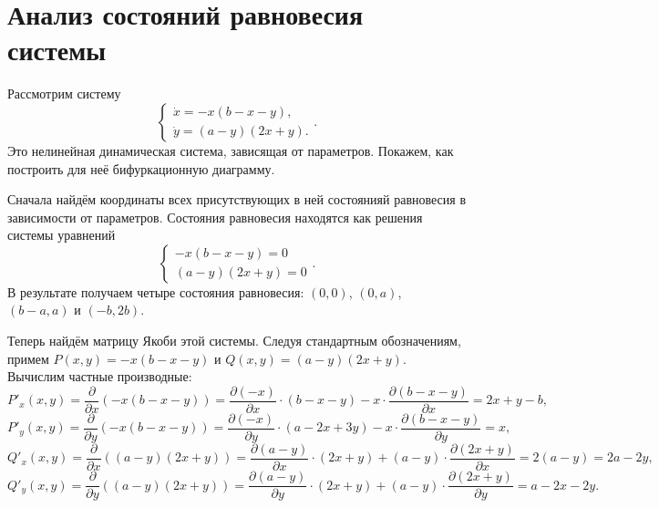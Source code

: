 






\renewcommand{\contentsname}{Содержание}
\newpage
\tableofcontents


\newpage
\section{Анализ состояний равновесия системы}
Рассмотрим систему 
$$ 
\left \lbrace 
\begin{matrix}
\dot{x} = -x(b-x-y), \\
\dot{y} = (a-y)(2x+y).
\end{matrix} 
\right . .$$
Это нелинейная динамическая система, зависящая от параметров. Покажем, как построить для неё бифуркационную диаграмму.

Сначала найдём координаты всех присутствующих в ней состоянияй равновесия в зависимости от параметров.
Состояния равновесия находятся как решения системы уравнений 
$$ 
\left \lbrace 
\begin{matrix}
-x(b-x-y) =  0 \\
(a-y)(2x+y)  =  0
\end{matrix} 
\right . .$$
В результате получаем четыре состояния равновесия: $(0, 0)$, $(0, a)$, $( b-a , a)$ и 
$ ( -b, 2b) $.

Теперь найдём матрицу Якоби этой системы. Следуя стандартным обозначениям, примем $P(x, y) = -x(b-x-y)$ и $Q(x, y) = (a-y)(2x+y)$.
Вычислим частные производные:
$$ P'_x (x, y) = \frac{\partial}{\partial x}(-x(b-x-y)) = \frac{\partial (-x)}{\partial x} \cdot (b-x-y) - x \cdot \frac{\partial (b-x-y)}{\partial x} = 2x + y -b, $$
$$ P'_y (x, y) = \frac{\partial}{\partial y}(-x(b-x-y)) = \frac{\partial (-x)}{\partial y} \cdot (a-2x+3y) - x \cdot \frac{\partial(b-x-y)}{\partial y} = x, $$
$$ Q'_x (x, y) = \frac{\partial}{\partial x}((a-y)(2x+y)) = \frac{\partial (a-y)}{\partial x} \cdot (2x+y) + (a-y) \cdot \frac{\partial(2x+y)}{\partial x} = 2(a-y) = 2a-2y,$$
$$ Q'_y (x, y) = \frac{\partial}{\partial y}((a-y)(2x+y)) = \frac{\partial (a-y)}{\partial y} \cdot (2x+y) + (a-y) \cdot \frac{\partial(2x+y)}{\partial y} = a-2x-2y.$$

